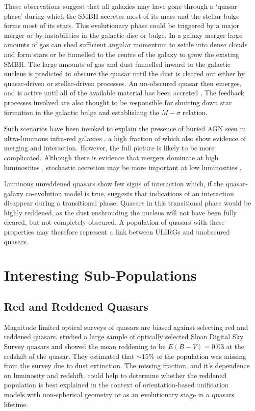 These observations suggest that all galaxies may have gone through a `quasar phase' during which the SMBH accretes most of its mass and the stellar-bulge forms most of its stars. 
This evolutionary phase could be triggered by a major merger or by instabilities in the galactic disc or bulge. 
In a galaxy merger large amounts of gas can shed sufficient angular momentum to settle into dense clouds and form stars or be funnelled to the centre of the galaxy to grow the existing SMBH. 
The large amounts of gas and dust funnelled inward to the galactic nucleus is predicted to obscure the quasar until the dust is cleared out either by quasar-driven or stellar-driven processes. 
An un-obscured quasar then emerges, and is active until all of the available material has been accreted \citep{hopkins06a, narayanan10}. 
The feedback processes involved are also thought to be responsible for shutting down star formation in the galactic bulge \citep{silk98} and establishing the $M-\sigma$ relation. 

Such scenarios have been invoked to explain the presence of buried AGN seen in ultra-luminous infra-red galaxies \citep[ULIRGs;][]{sanders88}, a high fraction of which also show evidence of merging and interaction. 
However, the full picture is likely to be more complicated. Although there is evidence that mergers dominate at high luminosities \citep{treister12}, stochastic accretion may be more important at low luminosities \citep[e.g.][]{hopkins06b}. 

Luminous unreddened quasars show few signs of interaction \citep[e.g.][]{dunlop03} which, if the quasar-galaxy co-evolution model is true, suggests that indications of an interaction disappear during a transitional phase. Quasars in this transitional phase would be highly reddened, as the dust enshrouding the nucleus will not have been fully cleared, but not completely obscured. 
A population of quasars with these properties may therefore represent a link between ULIRGs and unobscured quasars. 

\section{Interesting Sub-Populations}

\subsection{Red and Reddened Quasars}

Magnitude limited optical surveys of quasars are biased against selecting red and reddened quasars. 
\citet{richards03} studied a large sample of optically selected Sloan Digital Sky Survey \citep[SDSS;][]{york00} quasars and showed the mean reddening to be $E(B-V) = 0.03$ at the redshift of the quasar. 
They estimated that $\sim 15\%$ of the population was missing from the survey due to dust extinction. 
The missing fraction, and it's dependence on luminosity and redshift, could help to determine whether the reddened population is best explained in the context of orientation-based unification models with non-spherical geometry or as an evolutionary stage in a quasars lifetime.   


